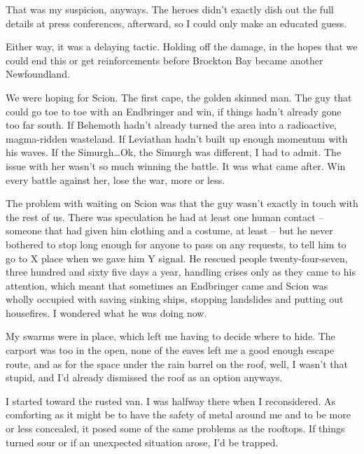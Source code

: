 That was my suspicion, anyways.  The heroes didn't exactly dish out the full details at press conferences, afterward, so I could only make an educated guess.



Either way, it was a delaying tactic.  Holding off the damage, in the hopes that we could end this or get reinforcements before Brockton Bay became another Newfoundland.



We were hoping for Scion.  The first cape, the golden skinned man.  The guy that could go toe to toe with an Endbringer and win, if things hadn't already gone too far south.  If Behemoth hadn't already turned the area into a radioactive, magma-ridden wasteland.  If Leviathan hadn't built up enough momentum with his waves.  If the Simurgh\ldots Ok, the Simurgh was different, I had to admit.  The issue with her wasn't so much winning the battle.  It was what came after.  Win every battle against her, lose the war, more or less.



The problem with waiting on Scion was that the guy wasn't exactly in touch with the rest of us.  There was speculation he had at least one human contact – someone that had given him clothing and a costume, at least – but he never bothered to stop long enough for anyone to pass on any requests, to tell him to go to X place when we gave him Y signal.  He rescued people twenty-four-seven, three hundred and sixty five days a year, handling crises only as they came to his attention, which meant that sometimes an Endbringer came and Scion was wholly occupied with saving sinking ships, stopping landslides and putting out housefires.  I wondered what he was doing now.



My swarms were in place, which left me having to decide where to hide.  The carport was too in the open, none of the eaves left me a good enough escape route, and as for the space under the rain barrel on the roof, well, I wasn't that stupid, and I'd already dismissed the roof as an option anyways.



I started toward the rusted van.  I was halfway there when I reconsidered.  As comforting as it might be to have the safety of metal around me and to be more or less concealed, it posed some of the same problems as the rooftops.  If things turned sour or if an unexpected situation arose, I'd be trapped.



